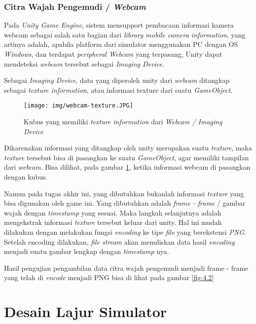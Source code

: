         \subsubsection{Citra Wajah Pengemudi / \textit{Webcam}}
        Pada \textit{Unity Game Engine}, sistem mensupport pembacaan informasi kamera webcam sebagai salah satu bagian dari \textit{library mobile camera information}, yang artinya adalah, apabila platform dari simulator menggunakan PC dengan OS \textit{Windows}, dan terdapat \textit{peripheral Webcam} yang terpasang, Unity dapat mendeteksi \textit{webcam} tersebut sebagai \textit{Imaging Device}.
        \par Sebagai \textit{Imaging Device}, data yang diperoleh unity dari \textit{webcam} ditangkap sebagai \textit{texture information}, atau informasi texture dari suatu \textit{GameObject}.
        
        \begin{figure}  [!htb]
	        \captionsetup{justification=centering}
	        \texttt{[image: img/webcam-texture.JPG]}
	        \caption{Kubus yang memiliki \textit{texture information} dari \textit{Webcam / Imaging Device}}
	        \label{fig: 3_26}
        \end{figure}
        
       Dikarenakan informasi yang ditangkap oleh unity merupakan suatu \textit{texture}, maka \textit{texture} tersebut bisa di pasangkan ke suatu \textit{GameObject}, agar memiliki tampilan dari \textit{webcam}.  Bisa dilihat, pada gambar \ref{fig: 3_26}, ketika informasi webcam di pasangkan dengan kubus.
       \par Namun pada tugas akhir ini, yang dibutuhkan bukanlah informasi \textit{texture} yang bisa digunakan oleh game ini. Yang dibutuhkan adalah \textit{frame - frame} / gambar wajah dengan \textit{timestamp} yang sesuai. Maka langkah selanjutnya adalah mengekstrak informasi \textit{texture} tersebut keluar dari unity. Hal ini mudah dilakukan dengan melakukan fungsi \textit{encoding} ke tipe \textit{file} yang berekstensi \textit{PNG}. Setelah encoding dilakukan, \textit{file stream} akan menuliskan data hasil \textit{encoding} menjadi suatu gambar lengkap dengan \textit{timestamp} nya.
       \par Hasil pengujian pengambilan data citra wajah pengemudi menjadi frame - frame yang telah di \textit{encode} menjadi PNG bisa di lihat pada gambar \ref{fig:4.2}
    
\section{Desain Lajur Simulator}
\vspace{1ex}

